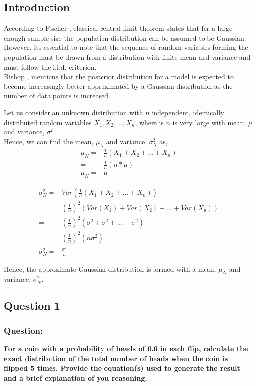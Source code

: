 \documentclass[12pt,twoside,a4paper]{article}
\begin{document}
\subsection{Introduction}

According to Fischer \cite{CLT}, classical central limit theorem states that for a large enough sample size the population distribution can be assumed to be Gaussian. However, its essential to note that the sequence of random variables forming the population must be drawn from a distribution with finite mean and variance and must follow the i.i.d. criterion. \\
Bishop \cite{ChrisPRML}, mentions that the posterior distribution for a model is expected to become increasingly better approximated by a Gaussian distribution as the number of data points is increased.

Let us consider an unknown distribution with $n$ independent, identically distributed random variables $X_1, X_2, ..., X_n$, where is $n$ is very large with mean, $\mu$ and variance, $\sigma^2$. \\

Hence, we can find the mean, $\mu_N$ and variance, $\sigma^2_N$ as,
\begin{align}
\mu_N =& \frac{1}{n}(X_1+X_2+...+X_n) \\
      =& \frac{1}{n}(n*\mu) \\
\mu_N =& \mu
\end{align}

\begin{align}
\sigma^2_N =& Var\left( \frac{1}{n}(X_1+X_2+...+X_n) \right ) \\
           =& \left( \frac{1}{n} \right )^2 \left(Var(X_1)+Var(X_2)+...+Var(X_n) \right ) \\
           =& \left( \frac{1}{n} \right )^2 \left(\sigma^2+\sigma^2+...+\sigma^2 \right ) \\
           =& \left( \frac{1}{n} \right )^2(n\sigma^2) \\
\sigma^2_N =& \frac{\sigma^2}{n}
\end{align}

Hence, the approximate Gaussian distribution is formed with a mean, $\mu_N$ and variance, $\sigma^2_N$.
\subsection{Question 1}

\subsubsection*{Question:}
\textbf{For a coin with a probability of heads of 0.6 in each flip, calculate the exact distribution of the total number of heads when the coin is flipped 5 times. Provide the equation(s) used to generate the result and a brief explanation of you reasoning.}
\end{document}

